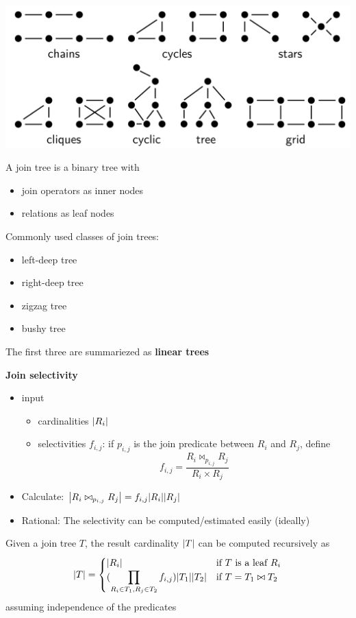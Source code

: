 \documentclass[11pt]{article}
\begin{document}
\begin{center}
\includegraphics[width=.8\textwidth]{../images/db/3.png}
\end{center}



A join tree is a binary tree with
\begin{itemize}
\item join operators as inner nodes
\item relations as leaf nodes
\end{itemize}

Commonly used classes of join trees:
\begin{itemize}
\item left-deep tree
\item right-deep tree
\item zigzag tree
\item bushy tree
\end{itemize}
The first three are summariezed as \textbf{linear trees}

\textbf{Join selectivity}
\begin{itemize}
\item input
\begin{itemize}
\item cardinalities \(\abs{R_i}\)
\item selectivities \(f_{i,j}\): if \(p_{i,j}\) is the join predicate between \(R_i\) and \(R_j\), define
\begin{equation*}
f_{i,j}=\frac{R_i\bowtie_{p_{i,j}}R_j}{R_i\times R_j}
\end{equation*}
\end{itemize}
\item Calculate: \(\abs{R_i\bowtie_{p_{i,j}}R_j}=f_{i,j}\abs{R_i}\abs{R_j}\)
\item Rational: The selectivity can be computed/estimated easily (ideally)
\end{itemize}

Given a join tree \(T\), the result cardinality \(\abs{T}\) can be computed recursively as
\begin{equation*}
\abs{T}=
\begin{cases}
\abs{R_i}&\text{if $T$ is a leaf }R_i\\
(\displaystyle\prod_{R_i\in T_1,R_j\in T_2}f_{i,j})\abs{T_1}\abs{T_2}&\text{if }T=T_1\bowtie T_2
\end{cases}
\end{equation*}
assuming independence of the predicates
\end{document}
